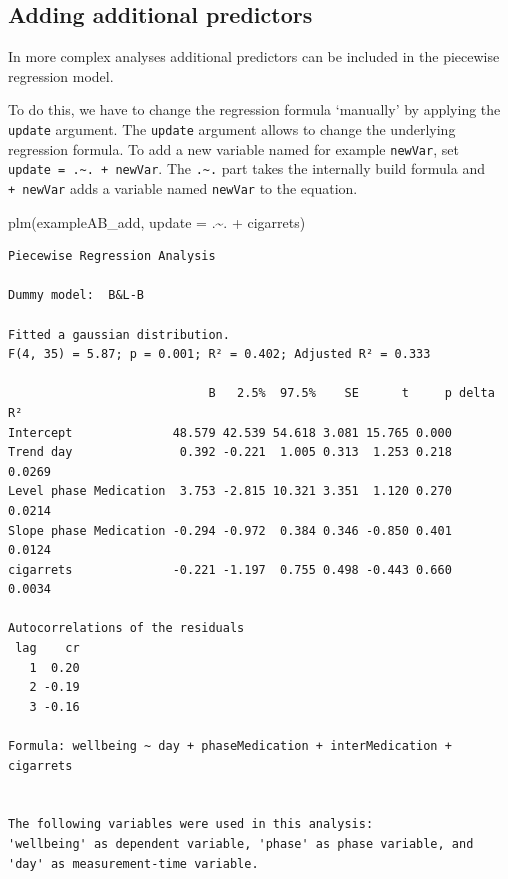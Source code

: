 \documentclass[
]{book}
\newenvironment{Shaded}{\begin{snugshade}}{\end{snugshade}}
\newcommand{\AttributeTok}[1]{\textcolor[rgb]{0.77,0.63,0.00}{#1}}
\newcommand{\FunctionTok}[1]{\textcolor[rgb]{0.00,0.00,0.00}{#1}}
\newcommand{\NormalTok}[1]{#1}
\newcommand{\SpecialCharTok}[1]{\textcolor[rgb]{0.00,0.00,0.00}{#1}}
\begin{document}
\hypertarget{adding-additional-predictors}{%
\subsection{Adding additional predictors}\label{adding-additional-predictors}}

In more complex analyses additional predictors can be included in the piecewise regression model.

To do this, we have to change the regression formula `manually' by applying the \texttt{update} argument. The \texttt{update} argument allows to change the underlying regression formula. To add a new variable named for example \texttt{newVar}, set \texttt{update\ =\ .\textasciitilde{}.\ +\ newVar}. The \texttt{.\textasciitilde{}.} part takes the internally build formula and \texttt{+\ newVar} adds a variable named \texttt{newVar} to the equation.

\begin{Shaded}
\begin{Highlighting}[]
\FunctionTok{plm}\NormalTok{(exampleAB\_add, }\AttributeTok{update =}\NormalTok{ .}\SpecialCharTok{\textasciitilde{}}\NormalTok{. }\SpecialCharTok{+}\NormalTok{ cigarrets)}
\end{Highlighting}
\end{Shaded}

\begin{verbatim}
Piecewise Regression Analysis

Dummy model:  B&L-B 

Fitted a gaussian distribution.
F(4, 35) = 5.87; p = 0.001; R² = 0.402; Adjusted R² = 0.333

                            B   2.5%  97.5%    SE      t     p delta R²
Intercept              48.579 42.539 54.618 3.081 15.765 0.000         
Trend day               0.392 -0.221  1.005 0.313  1.253 0.218   0.0269
Level phase Medication  3.753 -2.815 10.321 3.351  1.120 0.270   0.0214
Slope phase Medication -0.294 -0.972  0.384 0.346 -0.850 0.401   0.0124
cigarrets              -0.221 -1.197  0.755 0.498 -0.443 0.660   0.0034

Autocorrelations of the residuals
 lag    cr
   1  0.20
   2 -0.19
   3 -0.16

Formula: wellbeing ~ day + phaseMedication + interMedication + cigarrets


The following variables were used in this analysis:
'wellbeing' as dependent variable, 'phase' as phase variable, and 'day' as measurement-time variable.
\end{verbatim}
\end{document}
